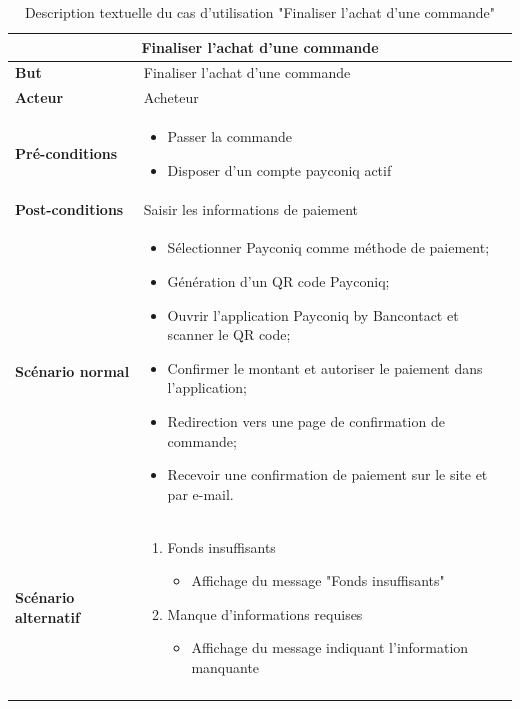 \begin{longtable}{|p{4cm}|p{11cm}|}
    \hline
    \multicolumn{2}{|c|}{\textbf{Finaliser l'achat d'une commande}} \\ \hline
    \textbf{But} & Finaliser l'achat d'une commande \\ \hline
    \textbf{Acteur} & Acheteur \\ \hline
    \textbf{Pré-conditions} & 
    \begin{itemize}
        \item Passer la commande
        \item Disposer d'un compte payconiq actif
    \end{itemize} \\ \hline
    \textbf{Post-conditions} & Saisir les informations de paiement \\ \hline
    \textbf{Scénario normal} &
    \begin{itemize}
        \item Sélectionner Payconiq comme méthode de paiement;
        \item Génération d'un QR code Payconiq;
        \item Ouvrir l'application Payconiq by Bancontact et scanner le QR code;
        \item Confirmer le montant et autoriser le paiement dans l'application;
        \item Redirection vers une page de confirmation de commande;
        \item Recevoir une confirmation de paiement sur le site et par e-mail.
    \end{itemize} \\ \hline
    \textbf{Scénario alternatif} &
    \begin{enumerate}
        \item Fonds insuffisants
        \begin{itemize}
            \item Affichage du message "Fonds insuffisants"
        \end{itemize}
        \item Manque d'informations requises
        \begin{itemize}
            \item Affichage du message indiquant l'information manquante
        \end{itemize}
    \end{enumerate} \\ \hline
    \caption{Description textuelle du cas d'utilisation "Finaliser l'achat d'une commande"}
    \label{tab:finaliser_commande}
    \end{longtable}


